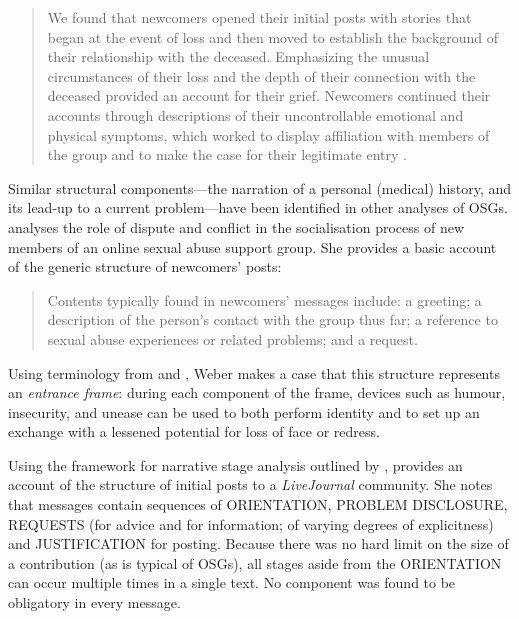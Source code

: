 \documentclass{article}
\begin{document}
\begin{quote}\small\singlespacing
We found that newcomers opened their initial posts with stories that began at the event of loss and then moved to establish the background of their relationship with the deceased. Emphasizing the unusual circumstances of their loss and the depth of their connection with the deceased provided an account for their grief. Newcomers continued their accounts through descriptions of their uncontrollable emotional and physical symptoms, which worked to display affiliation with members of the group and to make the case for their legitimate entry \parencite*[p.~5]{varga2014grieving}. 
\end{quote}
%
%
Similar structural components---the narration of a personal (medical) history, and its lead-up to a current problem---have been identified in other analyses of OSGs. \textcite[p.~4]{weber_missed_2011} analyses the role of dispute and conflict in the socialisation process of new members of an online sexual abuse support group. She provides a basic account of the generic structure of newcomers' posts:

\begin{quote}\small\singlespacing
Contents typically found in newcomers' messages include: a greeting; a description of the person's contact with the group thus far; a reference to sexual abuse experiences or related problems; and a request.
\end{quote}
%
Using terminology from \textcite{goffman_presentation_1959} and \textcite{brown_politeness:_1987}, Weber makes a case that this structure represents an \emph{entrance frame}: during each component of the frame, devices such as humour, insecurity, and unease can be used to both perform identity and to set up an exchange with a lessened potential for loss of face or redress. 

Using the framework for narrative stage analysis outlined by \textcite{labov_narrative_1997}, \textcite{kouper_pragmatics_2010} provides an account of the structure of initial posts to a \emph{LiveJournal} community. She notes that messages contain sequences of \textsc{ORIENTATION}, \textsc{PROBLEM DISCLOSURE}, \textsc{REQUESTS} (for advice and for information; of varying degrees of explicitness) and \textsc{JUSTIFICATION} for posting. Because there was no hard limit on the size of a contribution (as is typical of OSGs), all stages aside from the \textsc{ORIENTATION} can occur multiple times in a single text. No component was found to be obligatory in every message.
\end{document}
